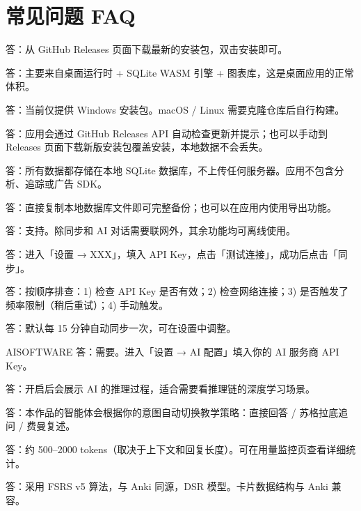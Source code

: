 \documentclass[12pt,a4paper,nomath]{harryopo-report}
\begin{document}
\ifshowfaq
\section{常见问题 FAQ}

答：从 GitHub Releases 页面下载最新的安装包，双击安装即可。

答：主要来自桌面运行时 + SQLite WASM 引擎 + 图表库，这是桌面应用的正常体积。

答：当前仅提供 Windows 安装包。macOS / Linux 需要克隆仓库后自行构建。

答：应用会通过 GitHub Releases API 自动检查更新并提示；也可以手动到 Releases 页面下载新版安装包覆盖安装，本地数据不会丢失。

答：所有数据都存储在本地 SQLite 数据库，不上传任何服务器。应用不包含分析、追踪或广告 SDK。

答：直接复制本地数据库文件即可完整备份；也可以在应用内使用导出功能。

答：支持。除同步和 AI 对话需要联网外，其余功能均可离线使用。

答：进入「设置 → XXX」，填入 API Key，点击「测试连接」，成功后点击「同步」。

答：按顺序排查：1) 检查 API Key 是否有效；2) 检查网络连接；3) 是否触发了频率限制（稍后重试）；4) 手动触发。

答：默认每 15 分钟自动同步一次，可在设置中调整。

\ifx\projectType AISOFTWARE
答：需要。进入「设置 → AI 配置」填入你的 AI 服务商 API Key。

答：开启后会展示 AI 的推理过程，适合需要看推理链的深度学习场景。

答：本作品的智能体会根据你的意图自动切换教学策略：直接回答 / 苏格拉底追问 / 费曼复述。

答：约 500--2000 tokens（取决于上下文和回复长度）。可在用量监控页查看详细统计。

答：采用 FSRS v5 算法，与 Anki 同源，DSR 模型。卡片数据结构与 Anki 兼容。
\end{document}
